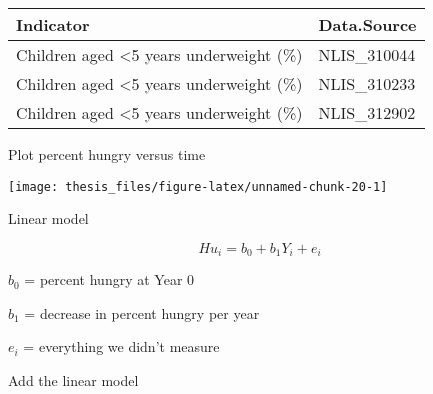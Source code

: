 \documentclass[12pt,openright,oneside,a4paper,chapter=TITLE,section=TITLE,subsection=Title,english,french,spanish,portugues,sumario=tradicional]{04-class-files/abntex2}
\newenvironment{Shaded}{\begin{snugshade}}{\end{snugshade}}
\newcommand{\DataTypeTok}[1]{\textcolor[rgb]{0.13,0.29,0.53}{#1}}
\newcommand{\DecValTok}[1]{\textcolor[rgb]{0.00,0.00,0.81}{#1}}
\newcommand{\KeywordTok}[1]{\textcolor[rgb]{0.13,0.29,0.53}{\textbf{#1}}}
\newcommand{\NormalTok}[1]{#1}
\newcommand{\OperatorTok}[1]{\textcolor[rgb]{0.81,0.36,0.00}{\textbf{#1}}}
\newcommand{\StringTok}[1]{\textcolor[rgb]{0.31,0.60,0.02}{#1}}
\begin{document}
\begin{tabular}{l|l}
\hline
Indicator & Data.Source\\
\hline
Children aged <5 years underweight (\%) & NLIS\_310044\\
\hline
Children aged <5 years underweight (\%) & NLIS\_310233\\
\hline
Children aged <5 years underweight (\%) & NLIS\_312902\\
\hline
\end{tabular}

Plot percent hungry versus time

\begin{Shaded}
\end{Shaded}

\begin{center}\texttt{[image: thesis\_files/figure-latex/unnamed-chunk-20-1]} \end{center}

Linear model

\[Hu_i = b_0 + b_1 Y_i + e_i\]

\(b_0\) = percent hungry at Year 0

\(b_1\) = decrease in percent hungry per year

\(e_i\) = everything we didn't measure

Add the linear model

\begin{Shaded}
\end{Shaded}
\end{document}
